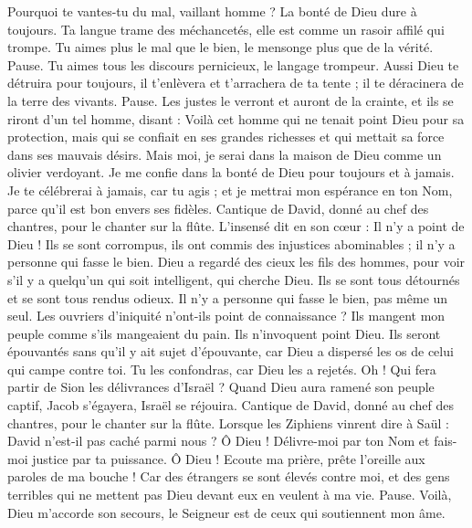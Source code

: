 \begin{multicols}{2}
Pourquoi te vantes-tu du mal, vaillant homme ? La bonté de Dieu dure à toujours.
Ta langue trame des méchancetés, elle est comme un rasoir affilé qui trompe.
Tu aimes plus le mal que le bien, le mensonge plus que de la vérité. Pause.
Tu aimes tous les discours pernicieux, le langage trompeur.
Aussi Dieu te détruira pour toujours, il t'enlèvera et t'arrachera de ta tente ; il te déracinera de la terre des vivants. Pause.
Les justes le verront et auront de la crainte, et ils se riront d'un tel homme, disant :
Voilà cet homme qui ne tenait point Dieu pour sa protection, mais qui se confiait en ses grandes richesses et qui mettait sa force dans ses mauvais désirs.
Mais moi, je serai dans la maison de Dieu comme un olivier verdoyant. Je me confie dans la bonté de Dieu pour toujours et à jamais.
Je te célébrerai à jamais, car tu agis ; et je mettrai mon espérance en ton Nom, parce qu'il est bon envers ses fidèles.
\VerseOne{}Cantique de David, donné au chef des chantres, pour le chanter sur la flûte.
L'insensé dit en son cœur : Il n'y a point de Dieu ! Ils se sont corrompus, ils ont commis des injustices abominables ; il n'y a personne qui fasse le bien.
Dieu a regardé des cieux les fils des hommes, pour voir s'il y a quelqu'un qui soit intelligent, qui cherche Dieu.
Ils se sont tous détournés et se sont tous rendus odieux. Il n'y a personne qui fasse le bien, pas même un seul.
Les ouvriers d'iniquité n'ont-ils point de connaissance ? Ils mangent mon peuple comme s'ils mangeaient du pain. Ils n'invoquent point Dieu.
Ils seront épouvantés sans qu’il y ait sujet d’épouvante, car Dieu a dispersé les os de celui qui campe contre toi. Tu les confondras, car Dieu les a rejetés.
Oh ! Qui fera partir de Sion les délivrances d'Israël ? Quand Dieu aura ramené son peuple captif, Jacob s'égayera, Israël se réjouira.
\VerseOne{}Cantique de David, donné au chef des chantres, pour le chanter sur la flûte.
Lorsque les Ziphiens vinrent dire à Saül : David n’est-il pas caché parmi nous ?
Ô Dieu ! Délivre-moi par ton Nom et fais-moi justice par ta puissance.
Ô Dieu ! Ecoute ma prière, prête l'oreille aux paroles de ma bouche !
Car des étrangers se sont élevés contre moi, et des gens terribles qui ne mettent pas Dieu devant eux en veulent à ma vie. Pause.
Voilà, Dieu m'accorde son secours, le Seigneur est de ceux qui soutiennent mon âme.

\end{multicols}
